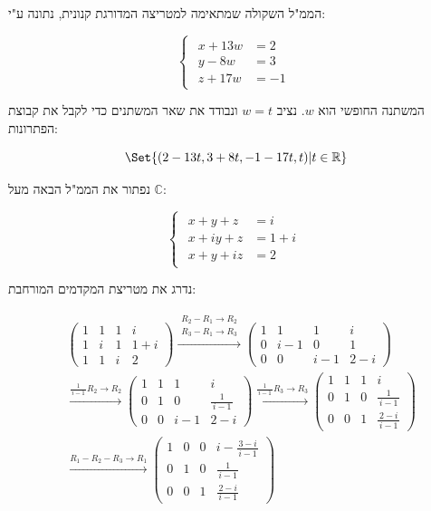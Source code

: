 \documentclass[
  hebrew,
  12pt,
  a4paper,
  oneside]{book}
\theoremstyle{definition}
\theoremstyle{remark}
\theoremstyle{plain}
\theoremstyle{remark}
\begin{document}
\begin{example}
הממ"ל השקולה שמתאימה למטריצה המדורגת קנונית, נתונה ע"י:

\[\begin{cases}
\begin{aligned}
x+13w &= 2 \\
y-8w &= 3 \\
z+17w &= -1
\end{aligned}
\end{cases}\]

המשתנה החופשי הוא \(w\). נציב \(w=t\) ונבודד את שאר המשתנים כדי לקבל את
קבוצת הפתרונות:

\[\Set{(2-13t,3+8t,-1-17t,t)|t\in\mathbb R}\]

\end{example}

\begin{example}

נפתור את הממ"ל הבאה מעל \(\mathbb C\):

\[\begin{cases}
\begin{aligned}
x  + y + z &= i \\
x+ iy + z &= 1+i \\
x + y + iz &= 2
\end{aligned}
\end{cases}\]

נדרג את מטריצת המקדמים המורחבת:

\[\begin{aligned}
&\left(\begin{array}{rrr|r}
1 & 1 & 1 & i \\
1 & i & 1 & 1 + i \\
1 & 1 & i & 2
\end{array}\right)
\xrightarrow{\substack{R_2 - R_1 \to R_2 \\ R_3 - R_1 \to R_3}}
\left(\begin{array}{rrr|r}
1 & 1 & 1 & i \\
0 & i - 1 & 0 & 1 \\
0 & 0 & i - 1 & 2 - i
\end{array}\right) \\[6pt]
&\xrightarrow{\tfrac{1}{\,i - 1\,} R_2 \to R_2}
\left(\begin{array}{rrr|r}
1 & 1 & 1 & i \\
0 & 1 & 0 & \tfrac{1}{\,i - 1\,} \\
0 & 0 & i - 1 & 2 - i
\end{array}\right)
\xrightarrow{\tfrac{1}{\,i - 1\,} R_3 \to R_3}
\left(\begin{array}{rrr|r}
1 & 1 & 1 & i \\
0 & 1 & 0 & \tfrac{1}{\,i - 1\,} \\
0 & 0 & 1 & \tfrac{2 - i}{\,i - 1\,}
\end{array}\right) \\[6pt]
&\xrightarrow{R_1 - R_2 - R_3 \to R_1}
\left(\begin{array}{rrr|r}
1 & 0 & 0 & i - \tfrac{3 - i}{\,i - 1\,} \\
0 & 1 & 0 & \tfrac{1}{\,i - 1\,} \\
0 & 0 & 1 & \tfrac{2 - i}{\,i - 1\,}
\end{array}\right)
\end{aligned}\]


\end{example}
\end{document}
